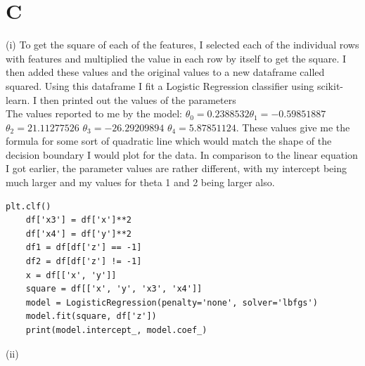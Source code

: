 \documentclass[10pt,a4paper]{article}
\begin{document}
\section{C}
(i)
To get the square of each of the features, I selected each of the individual rows with features and multiplied the value in each row by itself to get the square. I then added these values and the original values to a new dataframe called squared. Using this dataframe I fit a Logistic Regression classifier using scikit-learn. I then printed out the values of the parameters\\
The values reported to me by the model:  \(\theta_0 = 0.2388532  \theta_1 =-0.59851887  \) \(\theta_2 =  21.11277526 \) \( \theta_3= -26.29209894\) \(\theta_4 = 5.87851124 \). These values give me the formula for some sort of quadratic line which would match the shape of the decision boundary I would plot for the data. In comparison to the linear equation I got earlier, the parameter values are rather different, with my intercept being much larger and my values for theta 1 and 2 being larger also. 
\begin{verbatim}
plt.clf()
    df['x3'] = df['x']**2
    df['x4'] = df['y']**2
    df1 = df[df['z'] == -1]
    df2 = df[df['z'] != -1]
    x = df[['x', 'y']]
    square = df[['x', 'y', 'x3', 'x4']]
    model = LogisticRegression(penalty='none', solver='lbfgs')
    model.fit(square, df['z'])
    print(model.intercept_, model.coef_)
\end{verbatim}
(ii)
\end{document}
